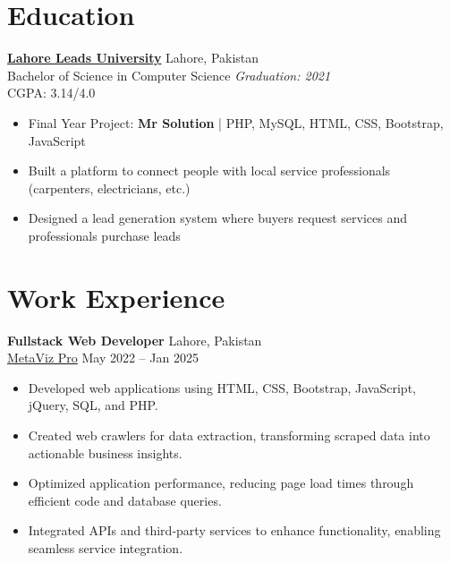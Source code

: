 \documentclass[a4paper,12pt]{article}
\begin{document}

\section{Education}

\textbf{\href{https://leads.edu.pk/}{Lahore Leads University}} \hfill Lahore, Pakistan \\
Bachelor of Science in Computer Science \hfill \textit{Graduation: 2021} \\
CGPA: 3.14/4.0

\begin{itemize}[leftmargin=*]
    \item Final Year Project: \textbf{Mr Solution} | PHP, MySQL, HTML, CSS, Bootstrap, JavaScript
    \item Built a platform to connect people with local service professionals (carpenters, electricians, etc.)
    \item Designed a lead generation system where buyers request services and professionals purchase leads
\end{itemize}



\section{Work Experience}

\textbf{Fullstack Web Developer} \hfill Lahore, Pakistan \\
\href{https://metaviz.pro/}{MetaViz Pro} \hfill May 2022 -- Jan 2025

\begin{itemize}[leftmargin=*]
    \item Developed web applications using HTML, CSS, Bootstrap, JavaScript, jQuery, SQL, and PHP.
    \item Created web crawlers for data extraction, transforming scraped data into actionable business insights.
    \item Optimized application performance, reducing page load times through efficient code and database queries.
    \item Integrated APIs and third-party services to enhance functionality, enabling seamless service integration.
\end{itemize}
\end{document}

